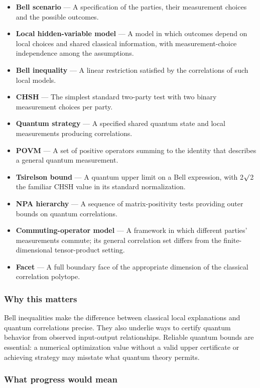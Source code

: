 \documentclass[
  11pt,
]{article}
\begin{document}
\begin{itemize}
\item
  \textbf{Bell scenario} --- A specification of the parties, their
  measurement choices and the possible outcomes.
\item
  \textbf{Local hidden-variable model} --- A model in which outcomes
  depend on local choices and shared classical information, with
  measurement-choice independence among the assumptions.
\item
  \textbf{Bell inequality} --- A linear restriction satisfied by the
  correlations of such local models.
\item
  \textbf{CHSH} --- The simplest standard two-party test with two binary
  measurement choices per party.
\item
  \textbf{Quantum strategy} --- A specified shared quantum state and
  local measurements producing correlations.
\item
  \textbf{POVM} --- A set of positive operators summing to the identity
  that describes a general quantum measurement.
\item
  \textbf{Tsirelson bound} --- A quantum upper limit on a Bell
  expression, with 2\ensuremath{\surd}2 the familiar CHSH value in its
  standard normalization.
\item
  \textbf{NPA hierarchy} --- A sequence of matrix-positivity tests
  providing outer bounds on quantum correlations.
\item
  \textbf{Commuting-operator model} --- A framework in which different
  parties' measurements commute; its general correlation set differs
  from the finite-dimensional tensor-product setting.
\item
  \textbf{Facet} --- A full boundary face of the appropriate dimension
  of the classical correlation polytope.
\end{itemize}

\subsubsection{Why this matters}

Bell inequalities make the difference between classical local
explanations and quantum correlations precise. They also underlie ways
to certify quantum behavior from observed input-output relationships.
Reliable quantum bounds are essential: a numerical optimization value
without a valid upper certificate or achieving strategy may misstate
what quantum theory permits.

\subsubsection{What progress would mean}
\end{document}
